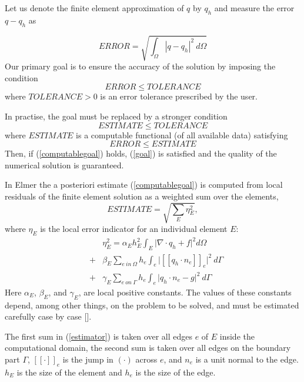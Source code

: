 \begin{versiona}
Let us denote the finite element approximation of $q$ by $q_h$ and
measure the error $q-q_h$ as

\begin{equation}
ERROR = \sqrt{ \int_\Omega | q - q_h |^2 \ d\Omega }
\end{equation}
Our primary goal is to ensure the accuracy of the solution by imposing
the condition
\begin{equation}
ERROR \le TOLERANCE \label{goal}
\end{equation}
where $TOLERANCE > 0$ is an error tolerance prescribed by the user.

In practise, the goal must be replaced by a stronger condition
\begin{equation}
ESTIMATE \le TOLERANCE \label{computablegoal}
\end{equation}
where $ESTIMATE$ is a computable functional (of all available data) satisfying
\begin{equation}
ERROR \le ESTIMATE 
\end{equation}
Then, if (\ref{computablegoal}) holds, (\ref{goal}) is satisfied and the quality
of the numerical solution is guaranteed.

In Elmer the a posteriori estimate (\ref{computablegoal}) is computed from 
local residuals of the finite element solution as a weighted sum over the
elements,
\begin{equation}
ESTIMATE = \sqrt{\sum_E \eta_E^2},
\end{equation}
where $\eta_E$ is the local error indicator for an individual element $E$:
\begin{eqnarray}
&& \eta_E^2 = \alpha_E h_E^2 \int_E 
\big|\nabla \cdot q_h + f \big|^2 d\Omega  \nonumber \\
&+& \beta_E \sum_{{ e \ in \ \Omega}}  h_e \int_e \big| [\![ 
q_h \cdot n_e ]\!]_e \big|^2 \ d\Gamma \label{estimator} \\ 
&+& \gamma_E \sum_{e \ on \  \Gamma} h_e 
\int_e \big| q_h\cdot n_e - g  \big|^2 \ d\Gamma \nonumber
\end{eqnarray}
Here $\alpha_E$, $\beta_E$, and $\gamma_E$, are local positive constants.
The values of these constants depend, among other things, on the problem
to be solved, and must be estimated carefully case by case [].

The first sum in (\ref{estimator}) is taken over all edges $e$ of $E$
inside the computational domain, the second sum is taken over all edges
on the boundary part $\Gamma$, $[\![ \cdot ]\!]_e$ is the jump in $(\cdot)$
across $e$, and $n_e$ is a unit normal to the edge. $h_E$ is the
size of the element and $h_e$ is the size of the edge.


\end{versiona}
